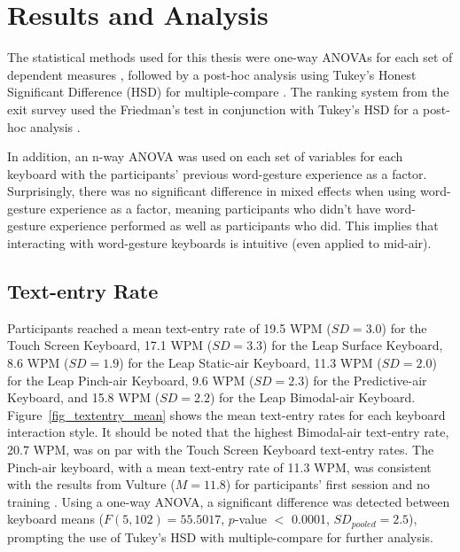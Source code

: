 \chapter{Results and Analysis} \label{results}
\hspace{\parindent}The statistical methods used for this thesis were one-way ANOVAs for each set of dependent measures \cite{ref_anova_1,ref_anova_2}, followed by a post-hoc analysis using Tukey's Honest Significant Difference (HSD) for multiple-compare \cite{ref_mult_compare}. The ranking system from the exit survey used the Friedman's test in conjunction with Tukey's HSD for a post-hoc analysis \cite{ref_friedmans}.

In addition, an n-way ANOVA was used on each set of variables for each keyboard with the participants' previous word-gesture experience as a factor. Surprisingly, there was no significant difference in mixed effects when using word-gesture experience as a factor, meaning participants who didn't have word-gesture experience performed as well as participants who did. This implies that interacting with word-gesture keyboards is intuitive (even applied to mid-air).

\section{Text-entry Rate} \label{results_text_entry_rate}
Participants reached a mean text-entry rate of 19.5 WPM ($SD = 3.0$) for the Touch Screen Keyboard, 17.1 WPM ($SD = 3.3$) for the Leap Surface Keyboard, 8.6 WPM ($SD = 1.9$) for the Leap Static-air Keyboard, 11.3 WPM ($SD = 2.0$) for the Leap Pinch-air Keyboard, 9.6 WPM ($SD = 2.3$) for the Predictive-air Keyboard, and 15.8 WPM ($SD = 2.2$) for the Leap Bimodal-air Keyboard. Figure~\ref{fig_textentry_mean} shows the mean text-entry rates for each keyboard interaction style.  It should be noted that the highest Bimodal-air text-entry rate, 20.7 WPM, was on par with the Touch Screen Keyboard text-entry rates. The Pinch-air keyboard, with a mean text-entry rate of 11.3 WPM, was consistent with the results from Vulture ($M = 11.8$) for participants' first session and no training \cite{ref_vulture}. Using a one-way ANOVA, a significant difference was detected between keyboard means ($F(5, 102) = 55.5017$, $p$-value $<$ 0.0001, $SD_{pooled} = 2.5$), prompting the use of Tukey's HSD with multiple-compare for further analysis.

